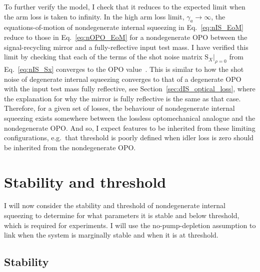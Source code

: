 To further verify the model, I check that it reduces to the expected limit when the arm loss is taken to infinity. 
In the high arm loss limit, $\gamma_a\rightarrow\infty$, the equations-of-motion of nondegenerate internal squeezing in Eq.~\ref{eq:nIS_EoM} reduce to those in Eq.~\ref{eq:nOPO_EoM} for a nondegenerate OPO between the signal-recycling mirror and a fully-reflective input test mass.
I have verified this limit by checking that each of the terms of the shot noise matrix $\text{S}_X|_{\rho=0}$ from Eq.~\ref{eq:nIS_Sx} converges to the OPO value~\cite{}. 
This is similar to how the shot noise of degenerate internal squeezing converges to that of a degenerate OPO with the input test mass fully reflective, see Section~\ref{sec:dIS_optical_loss}, where the explanation for why the mirror is fully reflective is the same as that case. 
Therefore, for a given set of losses, the behaviour of nondegenerate internal squeezing exists somewhere between the lossless optomechanical analogue and the nondegenerate OPO. And so, I expect features to be inherited from these limiting configurations, e.g.\ that threshold is poorly defined when idler loss is zero should be inherited from the nondegenerate OPO.


\section{Stability and threshold}
\label{sec:stability_and_threshold}

I will now consider the stability and threshold of nondegenerate internal squeezing to determine for what parameters it is stable and below threshold, which is required for experiments. I will use the no-pump-depletion assumption to link when the system is marginally stable and when it is at threshold.

\subsection{Stability}
\label{sec:nIS_stability}

